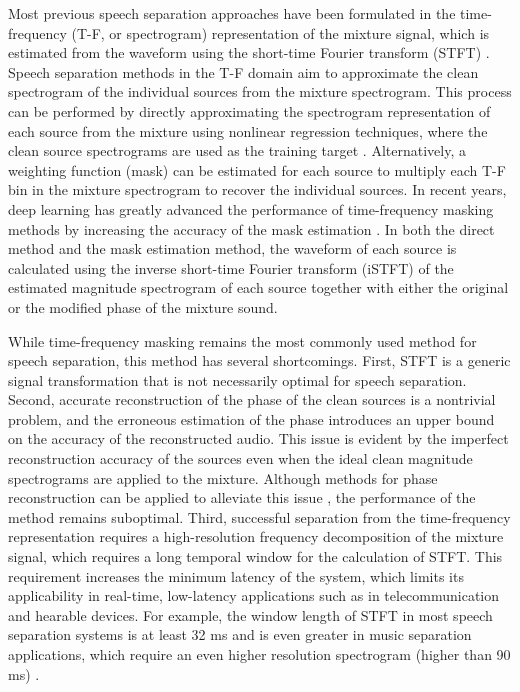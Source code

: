 \documentclass[journal]{IEEEtran}
\begin{document}
Most previous speech separation approaches have been formulated in the time-frequency (T-F, or spectrogram) representation of the mixture signal, which is estimated from the waveform using the short-time Fourier transform (STFT) \cite{wang2018supervised}. Speech separation methods in the T-F domain aim to approximate the clean spectrogram of the individual sources from the mixture spectrogram. This process can be performed by directly approximating the spectrogram representation of each source from the mixture using nonlinear regression techniques, where the clean source spectrograms are used as the training target \cite{lu2013speech, xu2014experimental, xu2015regression}. Alternatively, a weighting function (mask) can be estimated for each source to multiply each T-F bin in the mixture spectrogram to recover the individual sources. In recent years, deep learning has greatly advanced the performance of time-frequency masking methods by increasing the accuracy of the mask estimation \cite{isik2016single, yu2017permutation, kolbaek2017multitalker, chen2017deep, luo2017speaker, wang2018alternative, wang2018end, li2018cbldnn}. In both the direct method and the mask estimation method, the waveform of each source is calculated using the inverse short-time Fourier transform (iSTFT) of the estimated magnitude spectrogram of each source together with either the original or the modified phase of the mixture sound.

While time-frequency masking remains the most commonly used method for speech separation, this method has several shortcomings. First, STFT is a generic signal transformation that is not necessarily optimal for speech separation. Second, accurate reconstruction of the phase of the clean sources is a nontrivial problem, and the erroneous estimation of the phase introduces an upper bound on the accuracy of the reconstructed audio. This issue is evident by the imperfect reconstruction accuracy of the sources even when the ideal clean magnitude spectrograms are applied to the mixture. Although methods for phase reconstruction can be applied to alleviate this issue \cite{griffin1984signal, le2008explicit, wang2018end}, the performance of the method remains suboptimal. Third, successful separation from the time-frequency representation requires a high-resolution frequency decomposition of the mixture signal, which requires a long temporal window for the calculation of STFT. This requirement increases the minimum latency of the system, which limits its applicability in real-time, low-latency applications such as in telecommunication and hearable devices. For example, the window length of STFT in most speech separation systems is at least 32 ms \cite{isik2016single, kolbaek2017multitalker, chen2017deep} and is even greater in music separation applications, which require an even higher resolution spectrogram (higher than 90 ms) \cite{luo2017deep, jansson2017singing}.
\end{document}
